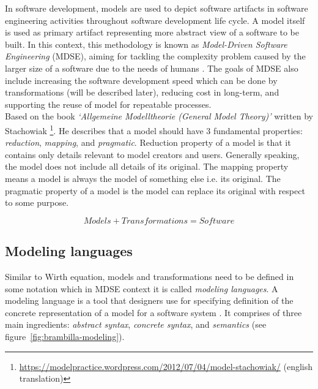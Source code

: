 In software development, models are used to depict software artifacts in software engineering activities throughout software development life cycle. A model itself is used as primary artifact representing more abstract view of a software to be built. In this context, this methodology is known as \textit{Model-Driven Software Engineering} (MDSE), aiming for tackling the complexity problem caused by the larger size of a software due to the needs of humans \cite{Brambilla}. The goals of MDSE also include increasing the software development speed which can be done by transformations (will be described later), reducing cost in long-term, and supporting the reuse of model for repeatable processes. \\

Based on the book \textit{`Allgemeine Modelltheorie (General Model Theory)'} written by Stachowiak \cite{Stachowiak}\footnote{ \url{https://modelpractice.wordpress.com/2012/07/04/model-stachowiak/} (english translation)}. He describes that a model should have 3 fundamental properties: \textit{reduction}, \textit{mapping}, and \textit{pragmatic}. Reduction property of a model is that it contains only details relevant to model creators and users. Generally speaking, the model does not include all details of its original. The mapping property means a model is always the model of something else i.e. its original. The pragmatic property of a model is the model can replace its original with respect to some purpose.

\begin{equation}
Models + Transformations = Software
\label{eg:mde}
\end{equation}

\subsection{Modeling languages}
\label{sec:modeling_languages}
Similar to Wirth equation, models and transformations need to be defined in some notation which in MDSE context it is called \textit{modeling languages}. A modeling language is a tool that designers use for specifying definition of the concrete representation of a model for a software system \cite{Brambilla}. It comprises of three main ingredients: \textit{abstract syntax}, \textit{concrete syntax}, and \textit{semantics} (see figure~\ref{fig:brambilla-modeling}). \\


